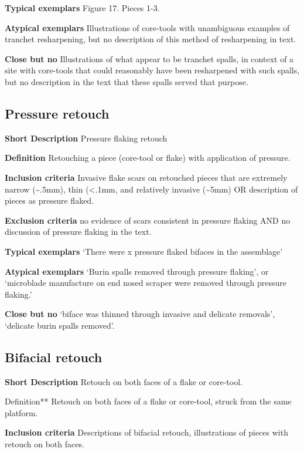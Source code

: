 \documentclass[
]{article}
\begin{document}
\textbf{Typical exemplars} Figure 17. Pieces 1-3.

\textbf{Atypical exemplars} Illustrations of core-tools with unambiguous
examples of tranchet resharpening, but no description of this method of
resharpening in text.

\textbf{Close but no} Illustrations of what appear to be tranchet
spalls, in context of a site with core-tools that could reasonably have
been resharpened with such spalls, but no description in the text that
these spalls served that purpose.

\hypertarget{pressure-retouch}{%
\subsection{Pressure retouch}\label{pressure-retouch}}

\textbf{Short Description} Pressure flaking retouch

\textbf{Definition} Retouching a piece (core-tool or flake) with
application of pressure.

\textbf{Inclusion criteria} Invasive flake scars on retouched pieces
that are extremely narrow (\textasciitilde.5mm), thin (\textless.1mm,
and relatively invasive (\textasciitilde5mm) OR description of pieces as
pressure flaked.

\textbf{Exclusion criteria} no evidence of scars consistent in pressure
flaking AND no discussion of pressure flaking in the text.

\textbf{Typical exemplars} `There were x pressure flaked bifaces in the
assemblage'

\textbf{Atypical exemplars} `Burin spalls removed through pressure
flaking', or `microblade manufacture on end nosed scraper were removed
through pressure flaking.'

\textbf{Close but no} `biface was thinned through invasive and delicate
removals', `delicate burin spalls removed'.

\hypertarget{bifacial-retouch}{%
\subsection{Bifacial retouch}\label{bifacial-retouch}}

\textbf{Short Description} Retouch on both faces of a flake or
core-tool.

Definition** Retouch on both faces of a flake or core-tool, struck from
the same platform.

\textbf{Inclusion criteria} Descriptions of bifacial retouch,
illustrations of pieces with retouch on both faces.
\end{document}
